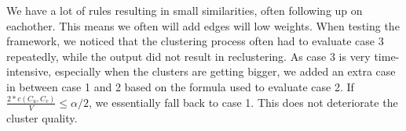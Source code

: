 We have a lot of rules resulting in small similarities, often following up on eachother. This means we often will add edges will low weights. When testing the framework, we noticed that the clustering process often had to evaluate case 3 repeatedly, while the output did not result in reclustering. As case 3 is very time-intensive, especially when the clusters are getting bigger, we added an extra case in between case 1 and 2 based on the formula used to evaluate case 2. If $\frac{2 * c(C_u,C_v)}{V} \leq \alpha / 2$, we essentially fall back to case 1. This does not deteriorate the cluster quality.

